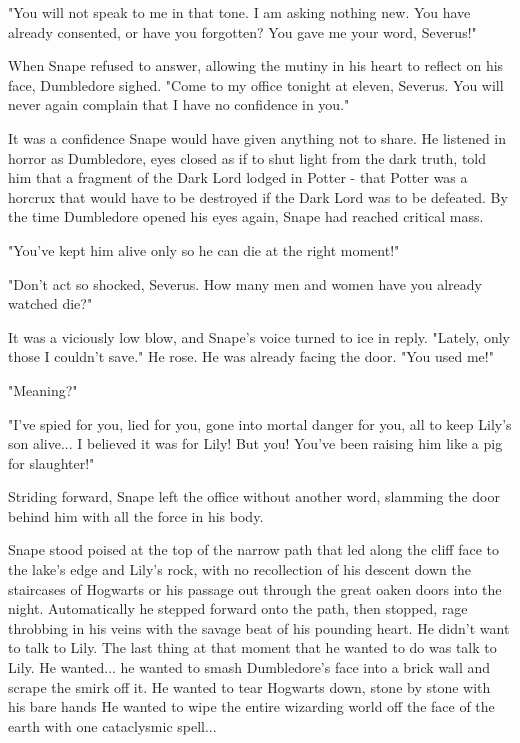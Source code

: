 "You will not speak to me in that tone. I am asking nothing new. You have already consented, or have you forgotten? You gave me your word, Severus!"

When Snape refused to answer, allowing the mutiny in his heart to reflect on his face, Dumbledore sighed. "Come to my office tonight at eleven, Severus. You will never again complain that I have no confidence in you."

It was a confidence Snape would have given anything not to share. He listened in horror as Dumbledore, eyes closed as if to shut light from the dark truth, told him that a fragment of the Dark Lord lodged in Potter - that Potter was a horcrux that would have to be destroyed if the Dark Lord was to be defeated. By the time Dumbledore opened his eyes again, Snape had reached critical mass.

"You've kept him alive only so he can die at the right moment!"

"Don't act so shocked, Severus. How many men and women have you already watched die?"

It was a viciously low blow, and Snape's voice turned to ice in reply. "Lately, only those I couldn't save." He rose. He was already facing the door. "You used me!"

"Meaning?"

"I've spied for you, lied for you, gone into mortal danger for you, all to keep Lily's son alive... I believed it was for Lily! But you! You've been raising him like a pig for slaughter!"

Striding forward, Snape left the office without another word, slamming the door behind him with all the force in his body.

\sbreak

Snape stood poised at the top of the narrow path that led along the cliff face to the lake's edge and Lily's rock, with no recollection of his descent down the staircases of Hogwarts or his passage out through the great oaken doors into the night. Automatically he stepped forward onto the path, then stopped, rage throbbing in his veins with the savage beat of his pounding heart. He didn't want to talk to Lily. The last thing at that moment that he wanted to do was talk to Lily. He wanted... he wanted to smash Dumbledore's face into a brick wall and scrape the smirk off it. He wanted to tear Hogwarts down, stone by stone with his bare hands He wanted to wipe the entire wizarding world off the face of the earth with one cataclysmic spell...

